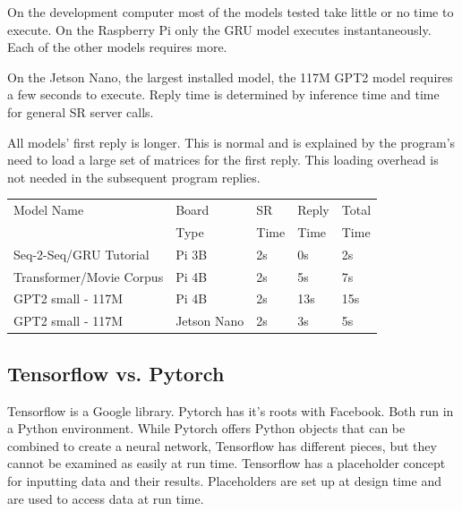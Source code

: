 On the development computer most of the models tested take little or no time to execute. On the Raspberry Pi only the GRU model executes instantaneously. Each of the other models requires more.  %

On the Jetson Nano, the largest installed model, the 117M GPT2 model requires a few seconds to execute. Reply time is determined by inference time and time for general SR server calls.

All models' first reply is longer. This is normal and is explained by the program's need to load a large set of matrices for the first reply. This loading overhead is not needed in the subsequent program replies. %

\label{setup-reply-time}

\begin{table}[H]
	
	\begin{center}
		
		
		\begin{tabular}{lllll}
			
			Model Name    & Board  & SR  & Reply    & Total  \\
			&  Type & Time  & Time    & Time  \\
			\hline
			\hline
			Seq-2-Seq/GRU Tutorial & Pi 3B     & 2s & 0s             & 2s   \\
			Transformer/Movie Corpus & Pi 4B      & 2s & 5s  & 7s      \\
			GPT2 small - 117M   & Pi 4B     & 2s   & 13s         & 15s      \\
			GPT2 small - 117M   & Jetson Nano & 2s   & 3s         & 5s      \\
			\hline
		\end{tabular}
		
		\bigskip
	\end{center}
	
	
	\label{fig:time-compare}
\end{table}


\subsection{Tensorflow vs. Pytorch}

Tensorflow is a Google library. Pytorch has it's roots with Facebook. Both run in a Python environment. While Pytorch offers Python objects that can be combined to create a neural network, Tensorflow has different pieces, but they cannot be examined as easily at run time. Tensorflow has a placeholder concept for inputting data and their results. Placeholders are set up at design time and are used to access data at run time.

